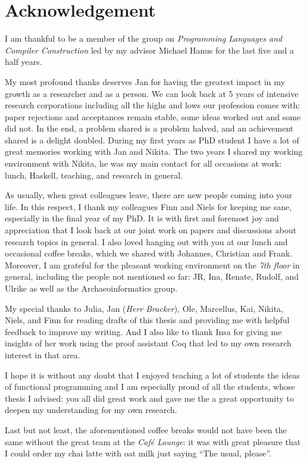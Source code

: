 %
\chapter*{Acknowledgement}
\label{sec:acknowledgement}
\vspace*{-10mm}

I am thankful to be a member of the group on \emph{Programming Languages and Compiler Construction} led by my advisor Michael Hanus for the last five and a half years.

My most profound thanks deserves Jan for having the greatest impact in my growth as a researcher and as a person.
We can look back at 5 years of intensive research corporations including all the highs and lows our profession comes with: paper rejections and acceptances remain stable, some ideas worked out and some did not.
In the end, a problem shared is a problem halved, and an achievement shared is a delight doubled.
During my first years as PhD student I have a lot of great memories working with Jan and Nikita.
The two years I shared my working environment with Nikita, he was my main contact for all occasions at work: lunch, Haskell, teaching, and research in general.

As usually, when great colleagues leave, there are new people coming into your life.
In this respect, I thank my colleagues Finn and Niels for keeping me sane, especially in the final year of my PhD.
It is with first and foremost joy and appreciation that I look back at our joint work on papers and discussions about research topics in general.
I also loved hanging out with you at our lunch and occasional coffee breaks, which we shared with Johannes, Christian and Frank.
Moreover, I am grateful for the pleasant working environment on the \emph{7th floor} in general, including the people not mentioned so far: JR, Ina, Renate, Rudolf, and Ulrike as well as the Archaeoinformatics group.

My special thanks to Julia, Jan (\emph{Herr Bracker}), Ole, Marcellus, Kai, Nikita, Niels, and Finn for reading drafts of this thesis and providing me with helpful feedback to improve my writing.
And I also like to thank Insa for giving me insights of her work using the proof assistant Coq that led to my own research interest in that area.

I hope it is without any doubt that I enjoyed teaching a lot of students the ideas of functional programming and I am especially proud of all the students, whose thesis I advised: you all did great work and gave me the a great opportunity to deepen my understanding for my own research.

Last but not least, the aforementioned coffee breaks would not have been the same without the great team at the \emph{Caf\'e Lounge}: it was with great pleasure that I could order my chai latte with oat milk just saying ``The usual, please''.